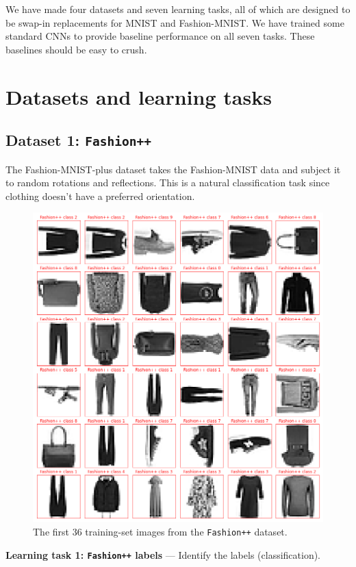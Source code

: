 \documentclass{article}
\renewcommand{\paragraph}[1]{\par\medskip\noindent\textbf{#1} ---}
\begin{document}
We have made four datasets and seven learning tasks, all of which are designed to be swap-in replacements for MNIST and Fashion-MNIST.
We have trained some standard CNNs to provide baseline performance on all seven tasks.
These baselines should be easy to crush.

\section{Datasets and learning tasks}

\subsection*{Dataset 1: \texttt{Fashion++}}
The Fashion-MNIST-plus dataset takes the Fashion-MNIST data and subject it to random rotations and reflections. This is a natural classification task since clothing doesn't have a preferred orientation.

\begin{figure}[t!]
\includegraphics[width=\textwidth]{../notebooks/Fashion++.png}
\caption{The first 36 training-set images from the \texttt{Fashion++} dataset.\label{fig:f}}
\end{figure}

\paragraph{Learning task 1: \texttt{Fashion++} labels}
Identify the labels (classification).
\end{document}
